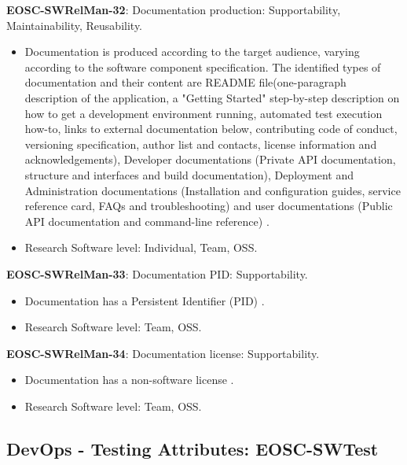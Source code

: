 \textbf{EOSC-SWRelMan-32}: Documentation production: Supportability, Maintainability, Reusability.

\begin{itemize}
    \item Documentation is produced according to the target audience, varying according to the software component specification. The identified types of documentation and their content are README file(one-paragraph description of the application, a "Getting Started" step-by-step description on how to get a development environment running, automated test execution how-to, links to external documentation below, contributing code of conduct, versioning specification, author list and contacts, license information and acknowledgements), Developer documentations (Private API documentation, structure and interfaces and build documentation), Deployment and Administration documentations (Installation and configuration guides, service reference card, FAQs and troubleshooting) and user documentations (Public API documentation and command-line reference) \cite{aberdour_achieving_2007,shepherdson_cessda_2019,orviz_set_2017,orviz_fernandez_eosc-synergy_2020,raymond_software_2013}.
    \item Research Software level: Individual, Team, OSS.
\end{itemize}

\textbf{EOSC-SWRelMan-33}: Documentation PID: Supportability.

\begin{itemize}
    \item Documentation has a Persistent Identifier (PID) \cite{orviz_fernandez_eosc-synergy_2020}.
    \item Research Software level: Team, OSS.
\end{itemize}

\textbf{EOSC-SWRelMan-34}: Documentation license: Supportability.

\begin{itemize}
    \item Documentation has a non-software license \cite{orviz_fernandez_eosc-synergy_2020}.
    \item Research Software level: Team, OSS.
\end{itemize}

\subsection{DevOps - Testing Attributes: EOSC-SWTest}

